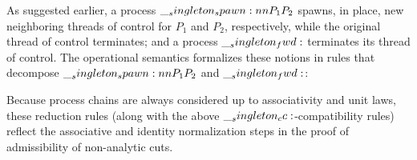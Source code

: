 As suggested earlier, a process $\__singleton_spawn:nn {P_1} {P_2}$ spawns, in place, new neighboring threads of control for $P_1$ and $P_2$, respectively, while the original thread of control terminates; and a process $\__singleton_fwd:$ terminates its thread of control.
The operational semantics formalizes these notions in rules that decompose $\__singleton_spawn:nn {P_1} {P_2}$ and $\__singleton_fwd:$:
%
Because process chains are always considered up to associativity and unit laws, these reduction rules (along with the above $\__singleton_cc:$-compatibility rules) reflect the associative and identity normalization steps in the proof of admissibility of non-analytic cuts.

